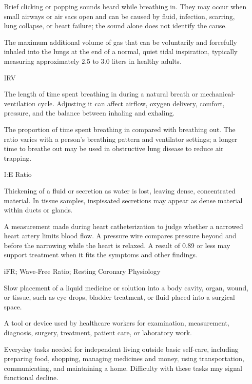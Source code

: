  Brief clicking or popping sounds heard while breathing in. They may occur when small airways or air sacs open and can be caused by fluid, infection, scarring, lung collapse, or heart failure; the sound alone does not identify the cause.

 The maximum additional volume of gas that can be voluntarily and forcefully inhaled into the lungs at the end of a normal, quiet tidal inspiration, typically measuring approximately 2.5 to 3.0 liters in healthy adults.

\synonyms
IRV

 The length of time spent breathing in during a natural breath or mechanical-ventilation cycle. Adjusting it can affect airflow, oxygen delivery, comfort, pressure, and the balance between inhaling and exhaling.

 The proportion of time spent breathing in compared with breathing out. The ratio varies with a person's breathing pattern and ventilator settings; a longer time to breathe out may be used in obstructive lung disease to reduce air trapping.

\synonyms
I:E Ratio

 Thickening of a fluid or secretion as water is lost, leaving dense, concentrated material. In tissue samples, inspissated secretions may appear as dense material within ducts or glands.

 A measurement made during heart catheterization to judge whether a narrowed heart artery limits blood flow. A pressure wire compares pressure beyond and before the narrowing while the heart is relaxed. A result of 0.89 or less may support treatment when it fits the symptoms and other findings.

\synonyms
iFR; Wave-Free Ratio; Resting Coronary Physiology

 Slow placement of a liquid medicine or solution into a body cavity, organ, wound, or tissue, such as eye drops, bladder treatment, or fluid placed into a surgical space.

 A tool or device used by healthcare workers for examination, measurement, diagnosis, surgery, treatment, patient care, or laboratory work.

 Everyday tasks needed for independent living outside basic self-care, including preparing food, shopping, managing medicines and money, using transportation, communicating, and maintaining a home. Difficulty with these tasks may signal functional decline.

